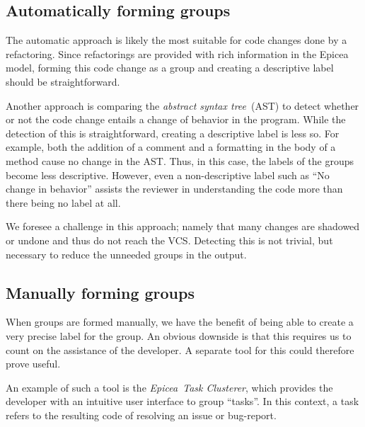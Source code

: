 \documentclass[conference,a4paper]{IEEEtran}
\newcommand{\Ep}{Epicea}
\begin{document}
\subsection{Automatically forming groups}
\label{sec:autom-form-groups}
The automatic approach is likely the most suitable for code changes
done by a refactoring. Since refactorings are provided with rich
information in the Epicea model, forming this code change as a group
and creating a descriptive label should be straightforward.

Another approach is comparing the \textit{abstract syntax tree}\ (AST)
to detect whether or not the code change entails a change of behavior
in the program. While the detection of this is straightforward,
creating a descriptive label is less so. For example, both the
addition of a comment and a formatting in the body of a method cause
no change in the AST. Thus, in this case, the labels of the groups
become less descriptive. However, even a non-descriptive label such as
``No change in behavior'' assists the reviewer in understanding the
code more than there being no label at all.

We foresee a challenge in this approach; namely that many changes are
shadowed or undone and thus do not reach the
VCS\cite{Nega12a}. Detecting this is not trivial, but necessary to
reduce the unneeded groups in the output.

\subsection{Manually forming groups}
\label{sec:manu-form-groups}
When groups are formed manually, we have the benefit of being able to
create a very precise label for the group. An obvious downside is that
this requires us to count on the assistance of the developer. A
separate tool for this could therefore prove useful.

An example of such a tool is the \textit{\Ep\ Task
  Clusterer}\cite{Dias15a}, which provides the developer with an
intuitive user interface to group ``tasks''. In this context, a task
refers to the resulting code of resolving an issue or bug-report.
\end{document}
